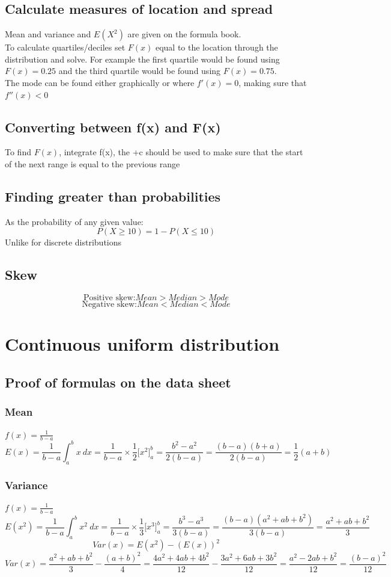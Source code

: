 \documentclass{article}[18pt]
\begin{document}
\subsection{Calculate measures of location and spread}
Mean and variance and $E(X^2)$ are given on the formula book.\\
To calculate quartiles/deciles set $F(x)$ equal to the location through the distribution and solve. For example the first quartile would be found using $F(x)=0.25$ and the third quartile would be found using $F(x)=0.75$.\\
The mode can be found either graphically or where $f'(x)=0$, making sure that $f''(x)<0$
\subsection{Converting between f(x) and F(x)}
To find $F(x)$, integrate f(x), the +c should be used to make sure that the start of the next range is equal to the previous range
\subsection{Finding greater than probabilities}
As the probability of any given value:
$$P(X\geqslant10)=1-P(X\leqslant10)$$
Unlike for discrete distributions
\subsection{Skew}
$$\textrm{Positive skew:} Mean>Median>Mode$$
$$\textrm{Negative skew:} Mean<Median<Mode$$
\newpage
\section{Continuous uniform distribution}
\subsection{Proof of formulas on the data sheet}
\subsubsection{Mean}
$f(x)=\frac{1}{b-a}$
$$E(x)=\frac{1}{b-a}\int_a^bx \ dx=\frac{1}{b-a}\times\frac{1}{2}\Big[x^2\Big]^b_a=\frac{b^2-a^2}{2(b-a)}=\frac{(b-a)(b+a)}{2(b-a)}=\frac{1}{2}(a+b)$$
\subsubsection{Variance}
$f(x)=\frac{1}{b-a}$
$$E(x^2)=\frac{1}{b-a}\int_a^bx^2 \ dx=\frac{1}{b-a}\times\frac{1}{3}\Big[x^3\Big]^b_a=\frac{b^3-a^3}{3(b-a)}=\frac{(b-a)(a^2+ab+b^2)}{3(b-a)}=\frac{a^2+ab+b^2}{3}$$
$$Var(x)=E(x^2)-(E(x))^2$$
$$Var(x)=\frac{a^2+ab+b^2}{3}-\frac{(a+b)^2}{4}=\frac{4a^2+4ab+4b^2}{12}-\frac{3a^2+6ab+3b^2}{12}=\frac{a^2-2ab+b^2}{12}=\frac{(b-a)^2}{12}$$
\end{document}
